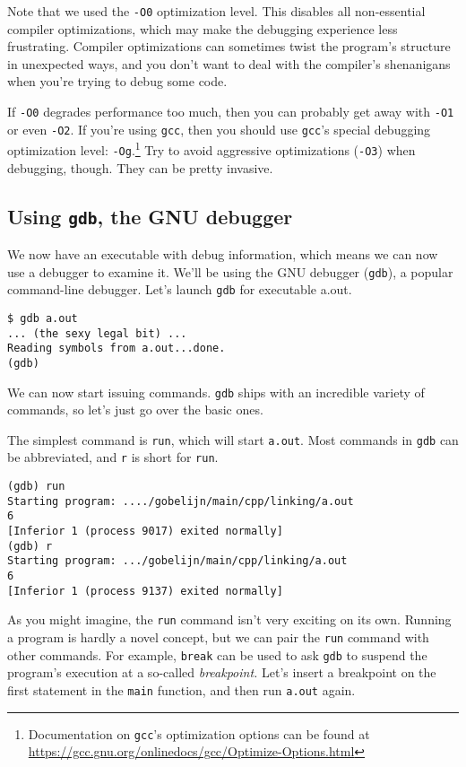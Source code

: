 \documentclass[12pt,a4paper]{article}
\newcommand{\gcc}{\texttt{gcc}}
\newcommand{\gnu}{GNU}
\newcommand{\gdb}{\texttt{gdb}}
\newcommand{\labelname}[1]{\texttt{#1}}
\newcommand{\functionname}[1]{\labelname{#1}}
\newcommand{\filename}[1]{\texttt{#1}}
\begin{document}
Note that we used the \texttt{-O0} optimization level. This disables all non-essential compiler optimizations, which may make the debugging experience less frustrating. Compiler optimizations can sometimes twist the program's structure in unexpected ways, and you don't want to deal with the compiler's shenanigans when you're trying to debug some code.

If \texttt{-O0} degrades performance too much, then you can probably get away with \texttt{-O1} or even \texttt{-O2}. If you're using \gcc{}, then you should use \gcc{}'s special debugging optimization level: \texttt{-Og}.\footnote{Documentation on \gcc{}'s optimization options can be found at \url{https://gcc.gnu.org/onlinedocs/gcc/Optimize-Options.html}} Try to avoid aggressive optimizations (\texttt{-O3}) when debugging, though. They can be pretty invasive.

\subsection{Using \gdb{}, the \gnu{} debugger}

We now have an executable with debug information, which means we can now use a debugger to examine it. We'll be using the \gnu{} debugger (\gdb{}), a popular command-line debugger. Let's launch \gdb{} for executable a.out.\\ 

\begin{lstlisting}[caption=running \gdb{}]
$ gdb a.out
... (the sexy legal bit) ...
Reading symbols from a.out...done.
(gdb)
\end{lstlisting}

We can now start issuing commands. \gdb{} ships with an incredible variety of commands, so let's just go over the basic ones.

The simplest command is \functionname{run}, which will start \filename{a.out}. Most commands in \gdb{} can be abbreviated, and \functionname{r} is short for \functionname{run}.\\

\begin{lstlisting}[caption=running \filename{a.out} in \gdb{}]
(gdb) run
Starting program: ..../gobelijn/main/cpp/linking/a.out 
6
[Inferior 1 (process 9017) exited normally]
(gdb) r
Starting program: .../gobelijn/main/cpp/linking/a.out 
6
[Inferior 1 (process 9137) exited normally]
\end{lstlisting}

As you might imagine, the \functionname{run} command isn't very exciting on its own. Running a program is hardly a novel concept, but we can pair the \functionname{run} command with other commands. For example, \functionname{break} can be used to ask \gdb{} to suspend the program's execution at a so-called \emph{breakpoint.} Let's insert a breakpoint on the first statement in the \functionname{main} function, and then run \filename{a.out} again.\\
\end{document}
